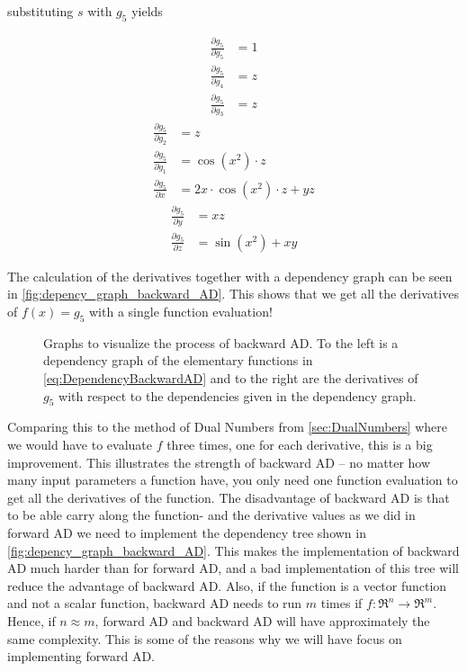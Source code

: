 substituting $s$ with $g_5$ yields
\begin{multicols}{3}
    \noindent
    \begin{align*}
        \frac{\partial g_5}{\partial g_5} &= 1\\
        \frac{\partial g_5}{\partial g_4} &= z\\
        \frac{\partial g_5}{\partial g_3} &= z
    \end{align*}
    \begin{align*}
        \frac{\partial g_5}{\partial g_2} &= z\\
        \frac{\partial g_5}{\partial g_1} &= \cos(x^2)\cdot z\\
        \frac{\partial g_5}{\partial x}   &= 2x\cdot\cos(x^2)\cdot z + yz
    \end{align*}
    \begin{align*}
        \frac{\partial g_5}{\partial y}   &= xz\\
        \frac{\partial g_5}{\partial z}   &= \sin(x^2)+xy
    \end{align*}
\end{multicols}
The calculation of the derivatives together with a dependency graph can be seen in \autoref{fig:depency_graph_backward_AD}. This shows that we get all the derivatives of $f(x) = g_5$ with a single function evaluation!
\begin{figure}[H]
	\centering
 	    \caption{Graphs to visualize the process of backward AD. To the left is a dependency graph of the elementary functions in \eqref{eq:DependencyBackwardAD} and to the right are the derivatives of $g_5$ with respect to the dependencies given in the dependency graph.}
	\label{fig:depency_graph_backward_AD}
\end{figure}
Comparing this to the method of Dual Numbers from \autoref{sec:DualNumbers} where we would have to evaluate $f$ three times, one for each derivative, this is a big improvement. This illustrates the strength of backward AD -- no matter how many input parameters a function have, you only need one function evaluation to get all the derivatives of the function. 
The disadvantage of backward AD is that to be able carry along the function- and the derivative values as we did in forward AD we need to implement the dependency tree shown in \autoref{fig:depency_graph_backward_AD}. This makes the implementation of backward AD much harder than for forward AD, and a bad implementation of this tree will reduce the advantage of backward AD. Also, if the function is a vector function and not a scalar function, backward AD needs to run $m$ times if $f: \Re^n \rightarrow \Re^m$. Hence, if $n\approx m$, forward AD and backward AD will have approximately the same complexity. This is some of the reasons why we will have focus on implementing forward AD.

